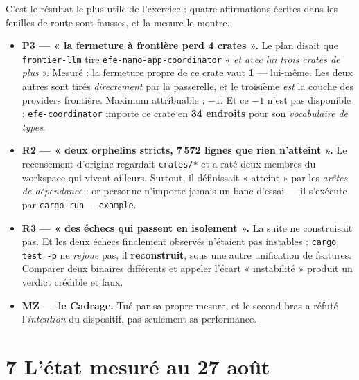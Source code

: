 \documentclass[11pt]{article}
\newcommand{\code}[1]{\texttt{\small #1}}
\newcommand{\mm}[1]{\textbf{#1}}
\begin{document}
C'est le résultat le plus utile de l'exercice : quatre affirmations écrites dans les feuilles de
route sont fausses, et la mesure le montre.

\begin{itemize}[leftmargin=1.3em,itemsep=3pt,topsep=3pt,label=\textendash]
\item \textbf{\mm{P3} --- « la fermeture à frontière perd 4 crates ».} Le plan disait que
\code{frontier-llm} tire \code{efe-nano-app-coordinator} « \emph{et avec lui trois crates de plus} ».
Mesuré : la fermeture propre de ce crate vaut \textbf{1} --- lui-même. Les deux autres sont tirés
\emph{directement} par la passerelle, et le troisième \emph{est} la couche des providers frontière.
Maximum attribuable : \textbf{$-1$}. Et ce $-1$ n'est pas disponible : \code{efe-coordinator}
importe ce crate en \textbf{34 endroits} pour son \emph{vocabulaire de types}.
\item \textbf{\mm{R2} --- « deux orphelins stricts, 7\,572 lignes que rien n'atteint ».} Le
recensement d'origine regardait \code{crates/*} et a raté deux membres du workspace qui vivent
ailleurs. Surtout, il définissait « atteint » par les \emph{arêtes de dépendance} : or personne
n'importe jamais un banc d'essai --- il s'exécute par \code{cargo run -{}-example}.
\item \textbf{\mm{R3} --- « des échecs qui passent en isolement ».} La suite ne construisait pas. Et
les deux échecs finalement observés n'étaient pas instables : \code{cargo test -p} ne \emph{rejoue}
pas, il \textbf{reconstruit}, sous une autre unification de features. Comparer deux binaires
différents et appeler l'écart « instabilité » produit un verdict crédible et faux.
\item \textbf{\mm{MZ} --- le Cadrage.} Tué par sa propre mesure, et le second bras a réfuté
l'\emph{intention} du dispositif, pas seulement sa performance.
\end{itemize}

\section{7 \;\textbar\; L'état mesuré au 27 août}
\end{document}
